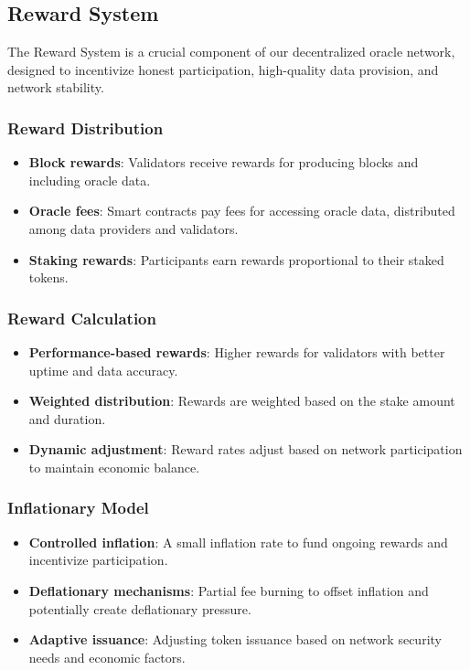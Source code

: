 \documentclass[12pt,a4paper]{article}
\begin{document}
	\subsection{Reward System}
	The Reward System is a crucial component of our decentralized oracle network, designed to incentivize honest participation, high-quality data provision, and network stability.
	
	\subsubsection{Reward Distribution}
	\begin{itemize}
		\item \textbf{Block rewards}: Validators receive rewards for producing blocks and including oracle data.
		\item \textbf{Oracle fees}: Smart contracts pay fees for accessing oracle data, distributed among data providers and validators.
		\item \textbf{Staking rewards}: Participants earn rewards proportional to their staked tokens.
	\end{itemize}
	
	\subsubsection{Reward Calculation}
	\begin{itemize}
		\item \textbf{Performance-based rewards}: Higher rewards for validators with better uptime and data accuracy.
		\item \textbf{Weighted distribution}: Rewards are weighted based on the stake amount and duration.
		\item \textbf{Dynamic adjustment}: Reward rates adjust based on network participation to maintain economic balance.
	\end{itemize}
	
	\subsubsection{Inflationary Model}
	\begin{itemize}
		\item \textbf{Controlled inflation}: A small inflation rate to fund ongoing rewards and incentivize participation.
		\item \textbf{Deflationary mechanisms}: Partial fee burning to offset inflation and potentially create deflationary pressure.
		\item \textbf{Adaptive issuance}: Adjusting token issuance based on network security needs and economic factors.
	\end{itemize}
	
\end{document}

